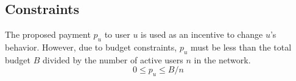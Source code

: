 \documentclass[times, 10pt,twocolumn]{article}
\begin{document}
\subsection{Constraints}
The proposed payment $p_u$ to user $u$ is used as an incentive to change $u$'s behavior. However, due to budget constraints, $p_u$ must be less than the total budget $B$ divided by the number of active users $n$ in the network.
\begin{equation}
0 \leq p_u \leq B/n
\end{equation}

\end{document}
